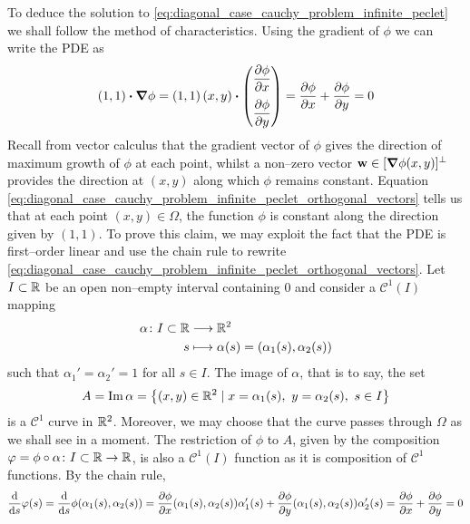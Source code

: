 To deduce the solution to
\eqref{eq:diagonal_case_cauchy_problem_infinite_peclet} we shall follow the
method of characteristics. Using the gradient of $\phi$ we can write the PDE as
\begin{equation} \label{eq:diagonal_case_cauchy_problem_infinite_peclet_orthogonal_vectors}
	\left( 1, 1 \right)
	\vdot
	\grad{\phi} = 
	\left( 1, 1 \right)(x,y)
	\vdot
	\begin{pmatrix}
		\displaystyle\pdv{\phi}{x} \\[10pt] \displaystyle\pdv{\phi}{y}
	\end{pmatrix} = 
	\pdv{\phi}{x}(x,y) + \pdv{\phi}{y}(x,y) = 0
\end{equation}
Recall from vector calculus that the gradient vector of $\phi$ gives the
direction of maximum growth of $\phi$ at each point, whilst a non--zero vector
$\vb{w} \in [\grad{\phi}(x,y)]^\perp$ provides the direction at $(x,y)$ along
which $\phi$ remains constant. Equation
\eqref{eq:diagonal_case_cauchy_problem_infinite_peclet_orthogonal_vectors} tells
us that at each point $(x,y) \in \Omega$, the function $\phi$ is constant along
the direction given by $(1, 1)$. To prove this claim, we may exploit the fact
that the PDE is first--order linear and use the chain rule to rewrite
\eqref{eq:diagonal_case_cauchy_problem_infinite_peclet_orthogonal_vectors}. Let
$I \subset \mathbb{R}$ be an open non--empty interval containing $0$ and consider a
$\mathcal{C}^1(I)$ mapping
\begin{equation}
	\begin{aligned}
		\alpha \colon I \subset \mathbb{R} &\longrightarrow \mathbb{R}^2 \\
		s &\longmapsto \alpha(s) = (\alpha_1(s), \alpha_2(s))
	\end{aligned}
\end{equation}
such that $\alpha_1' = \alpha_2' = 1$ for all $s \in I$. The image of $\alpha$,
that is to say, the set
\begin{equation}
	A = 
	\image \alpha = 
	\left\{ (x,y) \in \real^2 \mid x = \alpha_1(s), \ y = \alpha_2(s), \ s \in I \right\}
\end{equation}
is a $\mathcal{C}^1$ curve in $\mathbb{R}^2$. Moreover, we may choose that the curve
passes through $\Omega$ as we shall see in a moment. The restriction of $\phi$
to $A$, given by the composition $\varphi = \phi \circ \alpha \colon I \subset
\mathbb{R} \rightarrow \mathbb{R}$, is also a $\mathcal{C}^1(I)$ function as it is
composition of $\mathcal{C}^1$ functions. By the chain rule,
\begin{equation} \label{eq:diagonal_case_cauchy_problem_infinite_peclet_chain_rule}
	\frac{\dd}{\dd{s}} \varphi(s) = 
	\frac{\dd}{\dd{s}} \phi(\alpha_1(s), \alpha_2(s)) = 
	\frac{\partial \phi}{\partial x} (\alpha_1(s), \alpha_2(s)) \alpha_1'(s) +  	
	\frac{\partial \phi}{\partial y} (\alpha_1(s), \alpha_2(s)) \alpha_2'(s) =
	\pdv{\phi}{x} + \pdv{\phi}{y} = 0
\end{equation}
